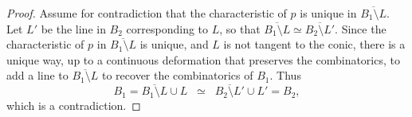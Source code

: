 \documentclass[10pt,a4paper]{amsart}
\begin{document}
\begin{proof}
Assume for contradiction that the characteristic of $p$ is unique in 
$\overline{B_1 \setminus L}$.  
Let $L'$ be the line in $B_2$ corresponding to $L$, so that 
$\overline{B_1 \setminus L} \simeq \overline{B_2 \setminus L'}$.  
Since the characteristic of $p$ in $\overline{B_1 \setminus L}$ is unique, and $L$ is not tangent to the conic, there is a unique way, up to a continuous deformation that preserves the combinatorics, to add a line to $\overline{B_1 \setminus L}$ to recover 
the combinatorics of $B_1$.  
Thus
\[
B_1 = \overline{B_1 \setminus L} \cup L \;\;\simeq\;\; 
\overline{B_2 \setminus L'} \cup L' = B_2,
\]
which is a contradiction.
\end{proof}
\end{document}
